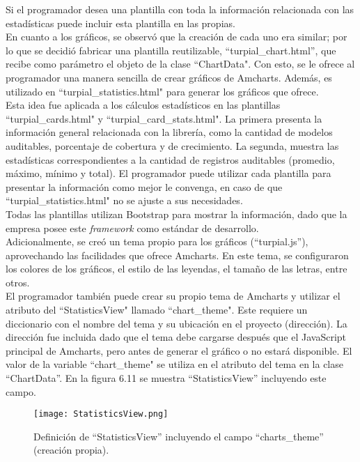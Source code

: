 Si el programador desea una plantilla con toda la información relacionada con las estadísticas puede incluir esta plantilla en las propias.\\

En cuanto a los gráficos, se observó que la creación de cada uno era similar; por lo que se decidió fabricar una plantilla reutilizable, “turpial\_chart.html”, que recibe como parámetro el objeto de la clase “ChartData". Con esto, se le ofrece al programador una manera sencilla de crear gráficos de Amcharts. Además, es utilizado en “turpial\_statistics.html" para generar los gráficos que ofrece. \\

Esta idea fue aplicada a los cálculos estadísticos en las plantillas “turpial\_cards.html" y “turpial\_card\_stats.html". La primera presenta  la información general relacionada con la librería, como la cantidad de modelos auditables, porcentaje de cobertura y de crecimiento. La segunda, muestra las estadísticas correspondientes a la cantidad de registros auditables (promedio, máximo, mínimo y total). El programador puede utilizar cada plantilla para presentar la información como mejor le convenga, en caso de que “turpial\_statistics.html" no se ajuste a sus necesidades.\\

Todas las plantillas utilizan Bootstrap para mostrar la información, dado que la empresa posee este \textit{framework} como estándar de desarrollo.\\

Adicionalmente, se creó un tema propio para los gráficos (“turpial.js”), aprovechando las facilidades que ofrece Amcharts. En este tema, se configuraron los colores de los gráficos, el estilo de las leyendas, el tamaño de las letras, entre otros.\\

El programador también puede crear su propio tema de Amcharts y utilizar el atributo del “StatisticsView" llamado “chart\_theme". Este requiere un diccionario con el nombre del tema y su ubicación en el proyecto (dirección). La dirección fue incluida dado que el tema debe cargarse después que el JavaScript principal de Amcharts, pero antes de generar el gráfico o no estará disponible. El valor de la variable “chart\_theme" se utiliza en el atributo del tema en la clase “ChartData”. En la figura 6.11 se muestra “StatisticsView” incluyendo este campo.\\

\begin{figure}[h]
\centering
\texttt{[image: StatisticsView.png]}
\caption{ Definición de “StatisticsView”  incluyendo el campo “charts\_theme” (creación propia).}
\label{fig:figura6.11}
\end{figure}

